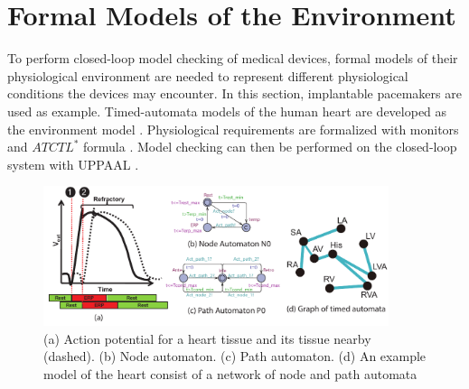 \section{Formal Models of the Environment}
\label{formalModelsofEnv}
To perform closed-loop model checking of medical devices, formal models of their physiological environment are needed to represent different physiological conditions the devices may encounter. In this section, implantable pacemakers are used as example. Timed-automata \cite{timed_automata} models of the human heart are developed as the environment model \cite{sttt13,VHM_proc}. Physiological requirements are formalized with monitors and $ATCTL^*$ formula \cite{TCTL}. 
Model checking can then be performed on the closed-loop system with UPPAAL \cite{uppaal}. %
\begin{figure}[!t]
	\centering
	\includegraphics[width=0.9\textwidth]{figs/init_abs.pdf}
	\caption{\small (a) Action potential for a heart tissue and its tissue nearby (dashed). (b) Node automaton. (c) Path automaton. (d) An example model of the heart consist of a network of node and path automata}
	\label{fig:nodepathTA}
\end{figure}

